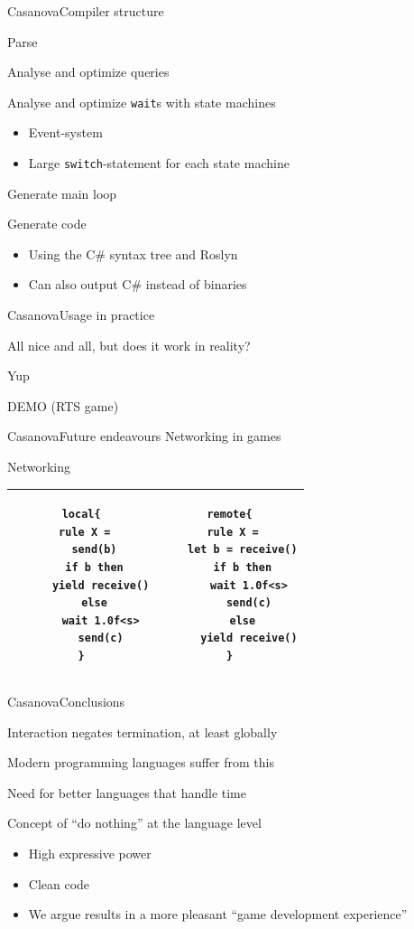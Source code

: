 \documentclass{beamer}
\begin{document}
\begin{slide}{Casanova}{Compiler structure}{
\item Parse
\item Analyse and optimize queries
\item Analyse and optimize \texttt{wait}s with state machines
\begin{itemize}
\item Event-system
\item Large \texttt{switch}-statement for each state machine
\end{itemize}
\item Generate main loop
\item Generate code
\begin{itemize}
\item Using the C\# syntax tree and Roslyn
\item Can also output C\# instead of binaries
\end{itemize}
}\end{slide}

\begin{slide}{Casanova}{Usage in practice}{
\item All nice and all, but does it work in reality?
\pause
\item Yup
\item DEMO (RTS game)
}\end{slide}

\begin{textslide}{Casanova}{Future endeavours}{
Networking in games
}\end{textslide}

\begin{frame}[fragile]{Networking}
\center
\begin{tabular}{| c | c |}
\hline
\begin{lstlisting}
local{
  rule X = 
    send(b)
    if b then
      yield receive()
    else
      wait 1.0f<s>
      send(c)
}
\end{lstlisting}
&
\begin{lstlisting}
remote{
  rule X = 
    let b = receive()
    if b then
      wait 1.0f<s>
      send(c)
    else
      yield receive()
}
\end{lstlisting}
\\
\hline
\end{tabular}
\end{frame}

\begin{slide}{Casanova}{Conclusions}{
\item Interaction negates termination, at least globally
\item Modern programming languages suffer from this
\item Need for better languages that handle time
\item Concept of ``do nothing'' at the language level
\begin{itemize}
\item High expressive power
\item Clean code
\item We argue results in a more pleasant ``game development experience''
\end{itemize}
}\end{slide}
\end{document}
